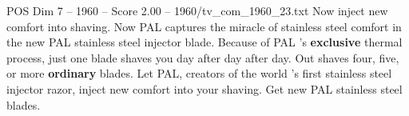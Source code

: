 \begin{textsample}{POS Dim 7 – 1960 – Score 2.00 – 1960/tv\_com\_1960\_23.txt}  \label{ex:f7_pos_027}
Now inject new comfort into shaving.
Now PAL captures the miracle of stainless steel comfort in the new PAL stainless steel injector blade.
Because of PAL 's \textbf{exclusive} thermal process, just one blade shaves you day after day after day.
Out shaves four, five, or more \textbf{ordinary} blades.
Let PAL, creators of the world 's first stainless steel injector razor, inject new comfort into your shaving.
Get new PAL stainless steel blades.

\end{textsample}
